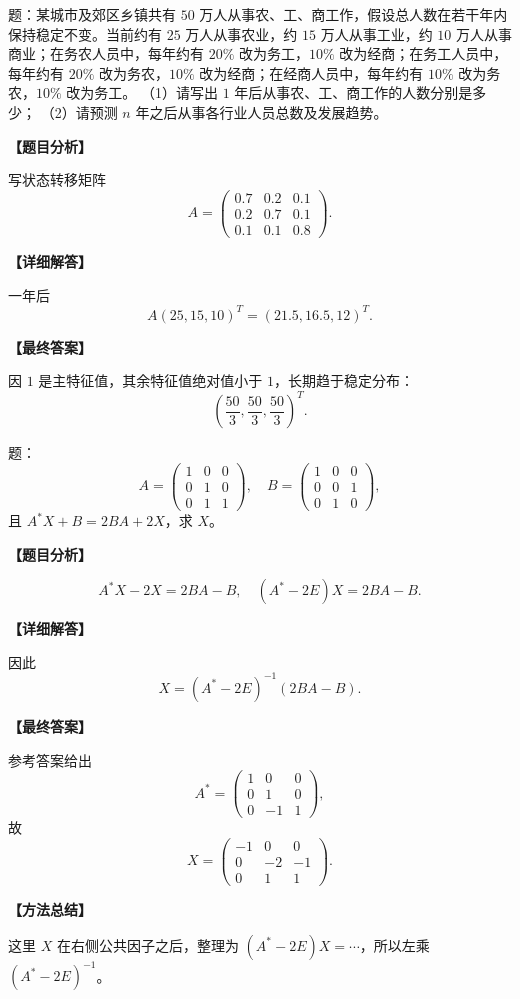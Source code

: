 ﻿\documentclass[11pt,a4paper,UTF8]{ctexart}
\begin{document}
\begin{answerbox}
题：某城市及郊区乡镇共有 $50$ 万人从事农、工、商工作，假设总人数在若干年内保持稳定不变。当前约有 $25$ 万人从事农业，约 $15$ 万人从事工业，约 $10$ 万人从事商业；在务农人员中，每年约有 $20\%$ 改为务工，$10\%$ 改为经商；在务工人员中，每年约有 $20\%$ 改为务农，$10\%$ 改为经商；在经商人员中，每年约有 $10\%$ 改为务农，$10\%$ 改为务工。
（1）请写出 $1$ 年后从事农、工、商工作的人数分别是多少；
（2）请预测 $n$ 年之后从事各行业人员总数及发展趋势。

\textbf{【题目分析】}

写状态转移矩阵
\[
A=\begin{pmatrix}
0.7&0.2&0.1\\
0.2&0.7&0.1\\
0.1&0.1&0.8
\end{pmatrix}.
\]

\textbf{【详细解答】}

一年后
\[
A(25,15,10)^T=(21.5,16.5,12)^T.
\]

\textbf{【最终答案】}

因 $1$ 是主特征值，其余特征值绝对值小于 $1$，长期趋于稳定分布：
\[\left(\frac{50}{3},\frac{50}{3},\frac{50}{3}\right)^T.\]
\end{answerbox}
\begin{answerbox}
题：
\[
A=\begin{pmatrix}1&0&0\\0&1&0\\0&1&1\end{pmatrix},\quad
B=\begin{pmatrix}1&0&0\\0&0&1\\0&1&0\end{pmatrix},
\]
且 $A^*X+B=2BA+2X$，求 $X$。

\textbf{【题目分析】}

\[A^*X-2X=2BA-B,\quad (A^*-2E)X=2BA-B.\]

\textbf{【详细解答】}

因此
\[X=(A^*-2E)^{-1}(2BA-B).\]

\textbf{【最终答案】}

参考答案给出
\[
A^*=
\begin{pmatrix}
1&0&0\\
0&1&0\\
0&-1&1
\end{pmatrix},
\]
故
\[
X=
\begin{pmatrix}
-1&0&0\\
0&-2&-1\\
0&1&1
\end{pmatrix}.
\]

\textbf{【方法总结】}

这里 \(X\) 在右侧公共因子之后，整理为 \((A^*-2E)X=\cdots\)，所以左乘 \((A^*-2E)^{-1}\)。
\end{answerbox}
\end{document}

